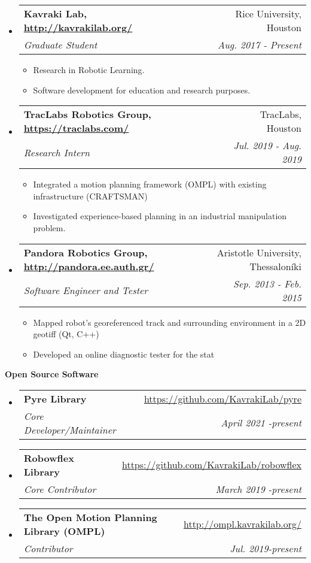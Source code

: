\documentclass[letterpaper,11pt]{article}
\makeatletter
\newcommand{\resitem}[1]{\item #1 \vspace{-2pt}}
\newcommand{\resheading}[1]{{\large \colorbox{mygrey}{\begin{minipage}{\textwidth}{\textbf{#1 \vphantom{p\^{E}}}}\end{minipage}}}}
\newcommand{\ressubheading}[4]{
\begin{tabular*}{7.0in}{l@{\extracolsep{\fill}}r}
		\textbf{#1} & #2 \\
		\textit{#3} & \textit{#4} \\
\end{tabular*}\vspace{-6pt}}
\makeatother
\begin{document}
\begin{itemize}
	
    \item
        \ressubheading{Kavraki Lab, \url{http://kavrakilab.org/}}
	{Rice University, Houston}{Graduate Student}
	{Aug. 2017 - Present  }
	\begin{itemize}
		\resitem{Research in Robotic Learning.}
		\resitem{Software development for education and research purposes.}
	\end{itemize}
    \item
    \ressubheading{TracLabs Robotics Group, \url{https://traclabs.com/}}
    {TracLabs, Houston}{Research Intern}
    {Jul. 2019 - Aug. 2019}
    \begin{itemize}
    	\resitem{Integrated a motion planning framework (OMPL) with existing infrastructure (CRAFTSMAN)}
    \resitem{Investigated experience-based planning in an industrial manipulation problem.}
    \end{itemize}
	\item
     \ressubheading{Pandora Robotics Group, \url{http://pandora.ee.auth.gr/}}
	{Aristotle University, Thessaloníki}{Software Engineer and Tester}
	{Sep. 2013 - Feb. 2015}
	\begin{itemize}
		\resitem{Mapped robot’s georeferenced track and surrounding environment in a 2D geotiff (Qt, C++)}
		\resitem{Developed an online diagnostic tester for the stat}
	\end{itemize}
\end{itemize}


\resheading{Open Source Software}
\begin{itemize}
    \item \ressubheading{Pyre Library}
        {\url{https://github.com/KavrakiLab/pyre}}{Core Developer/Maintainer}{April 2021 -present}
    \item \ressubheading{Robowflex Library}
        {\url{https://github.com/KavrakiLab/robowflex}}{Core Contributor}{March 2019 -present}
    \item \ressubheading{The Open Motion Planning Library (OMPL) }
        {\url{http://ompl.kavrakilab.org/}}{Contributor}{Jul. 2019-present}
\end{itemize}	
\end{document}
